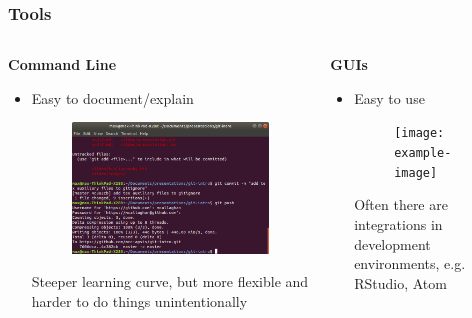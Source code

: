 \documentclass{beamer}
\begin{document}
\begin{frame}
\frametitle{Tools}

\begin{columns}[t]
	\begin{column}{0.5\linewidth}
		\textbf{Command Line}
		\begin{itemize}
			\item Easy to document/explain
			
			\begin{figure}
				\includegraphics[width=\linewidth]{images/git-terminal}
			\end{figure}
			
			Steeper learning curve, but more flexible and harder to do things unintentionally
		\end{itemize}
	\end{column}

	\begin{column}{0.5\linewidth}
		\textbf{GUIs}
		\begin{itemize}
			\item Easy to use
			
			\begin{figure}
				\texttt{[image: example-image]}
			\end{figure}
			
			Often there are integrations in development environments, e.g. RStudio, Atom
		\end{itemize}
	\end{column}
\end{columns}



\end{frame}
\end{document}
